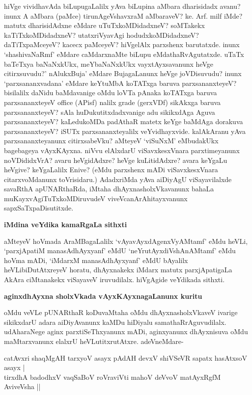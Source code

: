 \noindent
hiVge vividhavAda biLupugaLalilx yAva biLupina aMbara dharisidadx avanu? \hbox{inunx} A aMbara (paMce) tirunAgeVshavxraM aMbaraveV? ke. Arf. milf iMde? matutx dharisidAdxne eMdare uTuTxkoMDidadxneV? soMTakekx kaTiTxkoMDidadxneV? utatxriVyavAgi hodudxkoMDidadxneV? daTiTxpaMceyeV? kacecx paMceyeV? hiVgelAlx parxshenx barutatxde. inunx `shashivaNaRmf' eMdare caMdarxnaMte biLupu eMdathaRvAgutatxde. uTaTx baTeTxya baNaNxkUkx, meYbaNaNxkUkx vayxtAyxsavanunx heVge citirxsuvudu?' nAlukxBuja' \hbox{eMdare} BujagaLanunx heVge joVDisuvudu? inunx `parxsananxvadana' eMdare keYtuMbA koTATxga baruva parxsananxteyeV? bisilalilx daNidu baMdavanige oMdu loVTa pAnaka koTATxga baruva parxsananxteyeV {\rm office} (APisf) nalilx {\rm grade} (gerxVDf) sikAkxga baruva parxsananxteyeV? sAla huDukutitxdadxvanige adu sikikxdAga Aguva parxsananxteyeV? kaLedukoMDa padAthaR matetx keYge baMdAga dorakuva parxsananxteyeV? iSUTx parxsananxteyalilx veYvidhayxvide. kalAkAranu yAva parxsananxteyanunx citirxsabeVku? aMteyeV `viSuNxM' eMbudakUkx bagebageya vAyxKAyxna. niVvu elAlxdarU viSavxkesxVnara parxtimeyanunx noVDididxVrA? avaru heVgidAdxre? heVge kuLitidAdxre? avara keYgaLu heVgive? keYgaLalilx Enive? (eMdu parxshenx mADi viSavxkesxVnara citarxvoMdanunx toVrisidaru.) AdadxriMda yAva aiDiyAgU viSayavilalxde savaRthA apUNARthaRda, iMtaha dhAyxnasholxVkavanunx bahaLa muKayxvAgiTuTxkoMDiruvudeV viveVcanArAhitayxvanunx sapxSaTxpaDisutitxde.

{\bigskip
\noindent
{\large\bf iMdina veYdika kamaRgaLa sithxti}}\label{pages208}
\medskip

\noindent
aMteyeV hoVmada AraMBagaLalilx `vAyavAyxdAgenxVyAMtamf'\label{208} eMdu heVLi, `parxjApatiM manasAdhAyxyanf' eMdU `neYrutAyxdiVshAnAMtamf' eMdu hoVma mADi, `iMdarxM manasAdhAyxyanf' eMdU bAyalilx heVLibiDutAtxreyeV horatu, dhAyxnakekx iMdarx matutx parxjApatigaLa AkAra ciMtanakekx viSayaveV iruvudilalx. hiVgAgide veYdikada sithxti.

{\bigskip
\noindent
{\large\bf aginxdhAyxna sholxVkada vAyxKAyxnagaLanunx kuritu }}\label{page208}
\medskip

\noindent
oMdu veVLe pUNARthaR koDuvaMtaha oMdu dhAyxnasholxVkaveV ivarige sikikxdarU adara aiDiyAvanunx kaMDu hiDiyalu samathaRrAguvudilalx. udAharaNege aginx parxtiSeThxyanunx mADi, aginxyanunx dhAyxnisuva oMdu maMtarxvanunx elalxrU heVLutitxrutAtxre. adeVneMdare-

\begin{shloka}
catAvxri shaqMgAH tarxyoV asayx pAdAH devxV shiVSeVR sapatx hasAtxsoV asayx |\\\label{208a}
tirxdhA badodhxV vaqSaBoV roVraviVti mahoV deVvoV matAyxRgfM AviveVsha ||\label{117}
\end{shloka}

